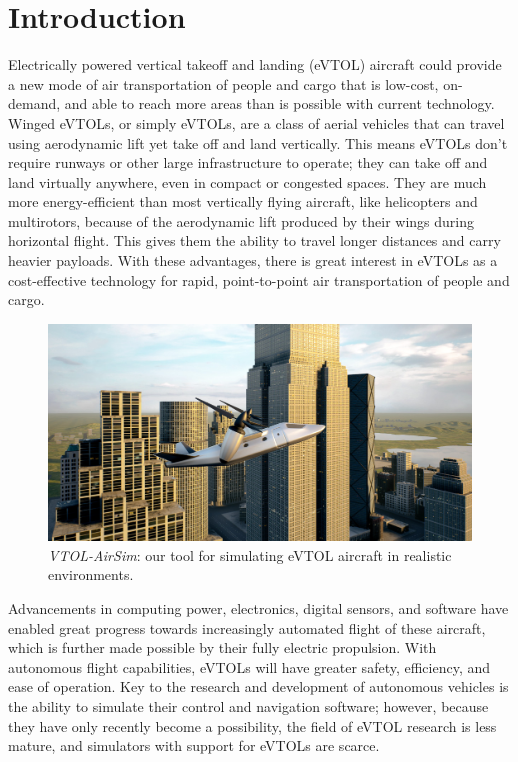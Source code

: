 
\chapter{Introduction}\label{chp:intro}

Electrically powered vertical takeoff and landing (eVTOL) aircraft could provide a new mode of air transportation of people and cargo that is low-cost, on-demand, and able to reach more areas than is possible with current technology. Winged eVTOLs, or simply eVTOLs, are a class of aerial vehicles that can travel using aerodynamic lift yet take off and land vertically. This means eVTOLs don't require runways or other large infrastructure to operate; they can take off and land virtually anywhere, even in compact or congested spaces. They are much more energy-efficient than most vertically flying aircraft, like helicopters and multirotors, because of the aerodynamic lift produced by their wings during horizontal flight. This gives them the ability to travel longer distances and carry heavier payloads. With these advantages, there is great interest in eVTOLs as a cost-effective technology for rapid, point-to-point air transportation of people and cargo.

\begin{figure}[h]
    \centering
    \includegraphics[width=\textwidth]{figures/vtol_airsim_cityblocks_crop3}
    \caption[Tiltrotor vehicle in CityBlocks environment]{
        \textit{VTOL-AirSim}: our tool for simulating eVTOL aircraft in realistic environments.}%
    \label{fig:vtol_airsim_cityblocks}
\end{figure}

Advancements in computing power, electronics, digital sensors, and software have enabled great progress towards increasingly automated flight of these aircraft, which is further made possible by their fully electric propulsion. With autonomous flight capabilities, eVTOLs will have greater safety, efficiency, and ease of operation. Key to the research and development of autonomous vehicles is the ability to simulate their control and navigation software; however, because they have only recently become a possibility, the field of eVTOL research is less mature, and simulators with support for eVTOLs are scarce.

